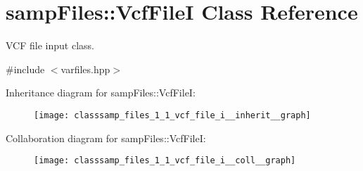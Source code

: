 \hypertarget{classsamp_files_1_1_vcf_file_i}{}\section{samp\+Files\+:\+:Vcf\+FileI Class Reference}
\label{classsamp_files_1_1_vcf_file_i}


V\+CF file input class.  




{\ttfamily \#include $<$varfiles.\+hpp$>$}



Inheritance diagram for samp\+Files\+:\+:Vcf\+FileI\+:\nopagebreak
\begin{figure}[H]
\begin{center}
\leavevmode
\texttt{[image: classsamp\_files\_1\_1\_vcf\_file\_i\_\_inherit\_\_graph]}
\end{center}
\end{figure}


Collaboration diagram for samp\+Files\+:\+:Vcf\+FileI\+:\nopagebreak
\begin{figure}[H]
\begin{center}
\leavevmode
\texttt{[image: classsamp\_files\_1\_1\_vcf\_file\_i\_\_coll\_\_graph]}
\end{center}
\end{figure}

